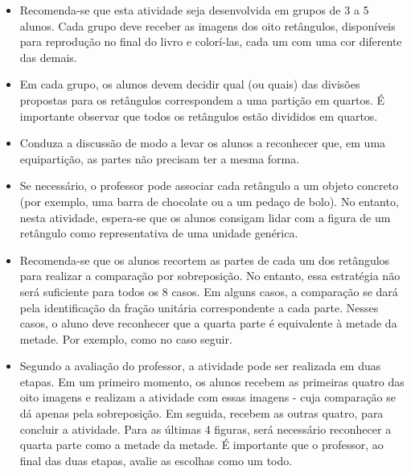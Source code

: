 \begin{multicols}{2}
   \vspace{.1cm}

\begin{itemize} %
    \item       Recomenda-se que esta atividade seja desenvolvida em grupos de 3 a 5 alunos. Cada grupo deve receber as imagens dos oito retângulos, disponíveis para reprodução no final do livro e colorí-las, cada um com uma cor diferente das demais.
    \item       Em cada grupo, os alunos devem decidir qual (ou quais) das divisões propostas para os retângulos correspondem a uma partição em quartos. É importante observar que todos os retângulos estão divididos em quartos.
    \item       Conduza a discussão de modo a levar os alunos a reconhecer que, em uma equipartição, as partes não precisam ter a mesma forma.
    \item       Se necessário, o professor pode associar cada retângulo a um objeto concreto (por exemplo, uma barra de chocolate ou a um pedaço de bolo). No entanto, nesta atividade, espera-se que os alunos consigam lidar com a figura de um retângulo como representativa de uma unidade genérica.
    \item       Recomenda-se que os alunos recortem as partes de cada um dos retângulos para realizar a comparação por sobreposição. No entanto, essa estratégia não será suficiente para todos os 8 casos. Em alguns casos, a comparação se dará pela identificação da fração unitária correspondente a cada parte. Nesses casos, o aluno deve reconhecer que a quarta parte é equivalente à metade da metade. Por exemplo, como no caso seguir.
\end{itemize} %

\noindent {}
\begin{itemize} %
    \item       Segundo a avaliação do professor, a atividade pode ser realizada em duas etapas. Em um primeiro momento, os alunos recebem as primeiras quatro das oito imagens e realizam a atividade com essas imagens - cuja comparação se dá apenas pela sobreposição. Em seguida, recebem as outras quatro, para concluir a atividade. Para as últimas 4 figuras, será necessário reconhecer a quarta parte como a metade da metade. É importante que o professor, ao final das duas etapas, avalie as escolhas como um todo.
\end{itemize} %



\end{multicols}
